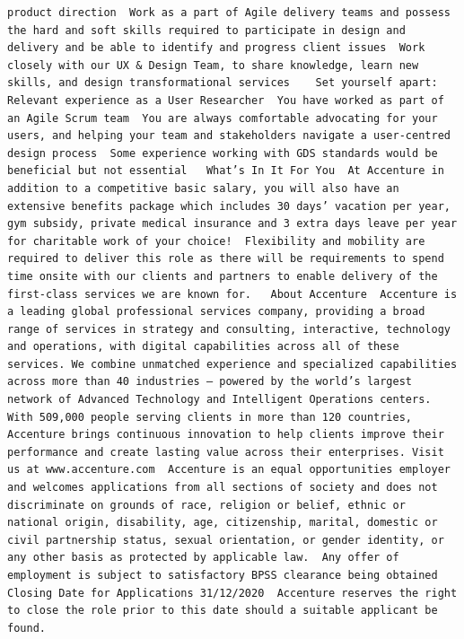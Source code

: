 \documentclass[
]{article}
\begin{document}
\begin{verbatim}
product direction  Work as a part of Agile delivery teams and possess the hard and soft skills required to participate in design and delivery and be able to identify and progress client issues  Work closely with our UX & Design Team, to share knowledge, learn new skills, and design transformational services    Set yourself apart:  Relevant experience as a User Researcher  You have worked as part of an Agile Scrum team  You are always comfortable advocating for your users, and helping your team and stakeholders navigate a user-centred design process  Some experience working with GDS standards would be beneficial but not essential   What’s In It For You  At Accenture in addition to a competitive basic salary, you will also have an extensive benefits package which includes 30 days’ vacation per year, gym subsidy, private medical insurance and 3 extra days leave per year for charitable work of your choice!  Flexibility and mobility are required to deliver this role as there will be requirements to spend time onsite with our clients and partners to enable delivery of the first-class services we are known for.   About Accenture  Accenture is a leading global professional services company, providing a broad range of services in strategy and consulting, interactive, technology and operations, with digital capabilities across all of these services. We combine unmatched experience and specialized capabilities across more than 40 industries — powered by the world’s largest network of Advanced Technology and Intelligent Operations centers. With 509,000 people serving clients in more than 120 countries, Accenture brings continuous innovation to help clients improve their performance and create lasting value across their enterprises. Visit us at www.accenture.com  Accenture is an equal opportunities employer and welcomes applications from all sections of society and does not discriminate on grounds of race, religion or belief, ethnic or national origin, disability, age, citizenship, marital, domestic or civil partnership status, sexual orientation, or gender identity, or any other basis as protected by applicable law.  Any offer of employment is subject to satisfactory BPSS clearance being obtained  Closing Date for Applications 31/12/2020  Accenture reserves the right to close the role prior to this date should a suitable applicant be found.

\end{verbatim}
\end{document}
